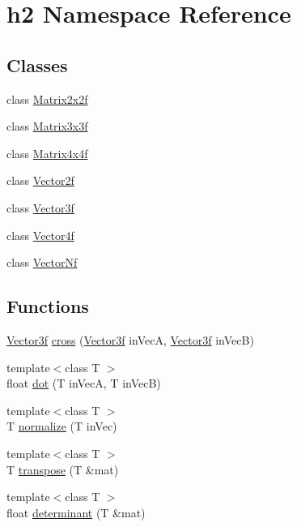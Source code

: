 \hypertarget{namespaceh2}{\section{h2 Namespace Reference}
\label{namespaceh2}
}
\subsection*{Classes}
\begin{DoxyCompactItemize}
\item 
class \hyperlink{classh2_1_1_matrix2x2f}{Matrix2x2f}
\item 
class \hyperlink{classh2_1_1_matrix3x3f}{Matrix3x3f}
\item 
class \hyperlink{classh2_1_1_matrix4x4f}{Matrix4x4f}
\item 
class \hyperlink{classh2_1_1_vector2f}{Vector2f}
\item 
class \hyperlink{classh2_1_1_vector3f}{Vector3f}
\item 
class \hyperlink{classh2_1_1_vector4f}{Vector4f}
\item 
class \hyperlink{classh2_1_1_vector_nf}{Vector\-Nf}
\end{DoxyCompactItemize}
\subsection*{Functions}
\begin{DoxyCompactItemize}
\item 
\hyperlink{classh2_1_1_vector3f}{Vector3f} \hyperlink{namespaceh2_a0a443f0b237f77c7eacd7b96051ba6c1}{cross} (\hyperlink{classh2_1_1_vector3f}{Vector3f} in\-Vec\-A, \hyperlink{classh2_1_1_vector3f}{Vector3f} in\-Vec\-B)
\item 
{\footnotesize template$<$class T $>$ }\\float \hyperlink{namespaceh2_a924da5cfd4b6a7bc3d475335f34eeb85}{dot} (T in\-Vec\-A, T in\-Vec\-B)
\item 
{\footnotesize template$<$class T $>$ }\\T \hyperlink{namespaceh2_adc91a762b9901992d98a1b5112e9cb0e}{normalize} (T in\-Vec)
\item 
{\footnotesize template$<$class T $>$ }\\T \hyperlink{namespaceh2_a5d5b33a8f1f4a93ee731dacabaf8e04e}{transpose} (T \&mat)
\item 
{\footnotesize template$<$class T $>$ }\\float \hyperlink{namespaceh2_a7ed9cca33fbc32b3bccea70dd4137e7c}{determinant} (T \&mat)
\end{DoxyCompactItemize}


